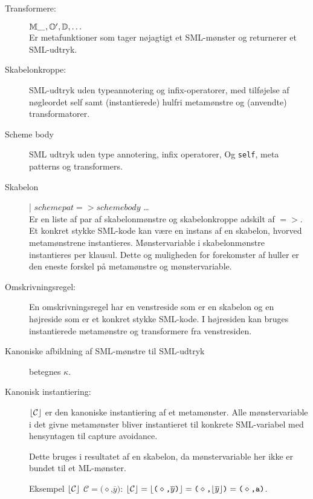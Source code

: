 \begin{description}
\item[Transformere:] %
  $\mathbb{M}_{\textnormal{\fontsize{2}{3pt}\selectfont egatron}}, \mathbb{O}',
  \mathbb{D}, \ldots$\\
  Er metafunktioner som tager nøjagtigt et SML-mønster og returnerer
  et SML-udtryk. 

\item[Skabelonkroppe:]
  SML-udtryk uden typeannotering og infix-operatorer, med tilføjelse af
  nøgleordet \textsf{self} samt (instantierede) hulfri metamønstre og (anvendte)
  transformatorer.

\item[Scheme body] SML udtryk uden type annotering, infix operatorer, Og
  \texttt{self}, meta patterns og transformers.


\item[Skabelon] | $schemepat => schemebody$ \ldots\\
  Er en liste af par af skabelonmønstre og skabelonkroppe adskilt af $=>$. Et
  konkret stykke SML-kode kan være en instans af en skabelon, hvorved
  metamønstrene instantieres. Mønstervariable i skabelonmønstre instantieres per
  klausul. Dette og muligheden for forekomster af huller er den eneste forskel
  på metamønstre og mønstervariable.

\item[Omskrivningsregel:]
  En omskrivningsregel har en venstreside som er en skabelon og en højreside som
  er et konkret stykke SML-kode. I højresiden kan bruges instantierede
  metamønstre og transformere fra venstresiden.

\item[Kanoniske afbildning af SML-mønstre til SML-udtryk] betegnes $\kappa$.

\item[Kanonisk instantiering:] $\lfloor \mathcal{C} \rfloor$ er den kanoniske
  instantiering af et metamønster. Alle mønstervariable i det givne metamønster bliver
  instantieret til konkrete SML-variabel med hensyntagen til capture
  avoidance.

  Dette bruges i resultatet af en skabelon, da mønstervariable her ikke er
  bundet til et ML-mønster.

  Eksempel $\lfloor \mathcal{C} \rfloor$ $\mathcal{C} = \texttt{(}\diamond\texttt{,} \overline{y}\texttt{)}$:
  $\lfloor \mathcal{C} \rfloor = \lfloor \texttt{(}\diamond\texttt{,} \overline{y}\texttt{)} \rfloor = \texttt{(}\diamond\texttt{,}
  \lfloor \overline{y} \rfloor\texttt{)} = \texttt{(}\diamond\texttt{,} \texttt{a)}$.
 
\end{description}

